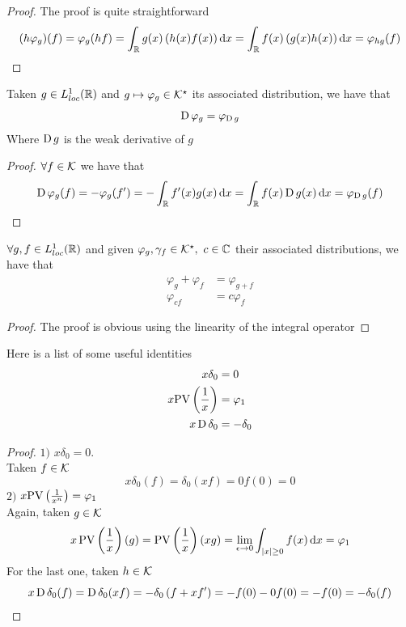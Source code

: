 \documentclass[../complete.tex]{subfiles}
\begin{document}
\begin{proof}
	The proof is quite straightforward
	\begin{equation*}
		(h\varphi_g)(f)=\varphi_g(hf)=\int_{\R}^{}g(x)\left( h(x)f(x) \right)\diff x=\int_{\R}^{}f(x)\left( g(x)h(x) \right)\diff x=\varphi_{hg}(f)
	\end{equation*}
\end{proof}
\begin{thm}
	Taken $g\in L^1_{loc}(\R)$ and $g\mapsto\varphi_g\in\K^\star$ its associated distribution, we have that
	\begin{equation*}
		\D\varphi_g=\varphi_{\D g}
	\end{equation*}
	Where $\D g$ is the weak derivative of $g$
\end{thm}
\begin{proof}
	$\forall f\in\K$ we have that
	\begin{equation*}
		\D\varphi_g(f)=-\varphi_g(f')=-\int_{\R}^{}f'(x)g(x)\diff x=\int_{\R}^{}f(x)\D g(x)\diff x=\varphi_{\D g}(f)
	\end{equation*}
\end{proof}
\begin{thm}
	$\forall g,f\in L^1_{loc}(\R)$ and given $\varphi_g,\gamma_f\in\K^\star,\ c\in\Cf$ their associated distributions, we have that
	\begin{equation*}
		\begin{aligned}
			\varphi_g+\varphi_f&=\varphi_{g+f}\\
			\varphi_{cf}&=c\varphi_f
		\end{aligned}
	\end{equation*}
\end{thm}
\begin{proof}
	The proof is obvious using the linearity of the integral operator
\end{proof}
\begin{thm}
	Here is a list of some useful identities
	\begin{equation}
		\begin{aligned}
			x\delta_0&=0\\
			x\cpvdist[]&=\varphi_1\\
			x\D\delta_0&=-\delta_0
		\end{aligned}
		\label{eq:distitent}
	\end{equation}
\end{thm}
\begin{proof}
	$1)$ $x\delta_0=0$.\\
	Taken $f\in\K$
	\begin{equation*}
		x\delta_0(f)=\delta_0(xf)=0f(0)=0
	\end{equation*}
	$2)$ $x\cpvdist=\varphi_1$\\
	Again, taken $g\in\K$
	\begin{equation*}
		x\cpv\left( \frac{1}{x} \right)(g)=\cpv\left( \frac{1}{x} \right)(xg)=\lim_{\epsilon\to0}\int_{\abs{x}\ge0}^{}f(x)\diff x=\varphi_1
	\end{equation*}
	For the last one, taken $h\in\K$
	\begin{equation*}
		x\D\delta_0(f)=\D\delta_0(xf)=-\delta_0\left( f+xf' \right)=-f(0)-0f(0)=-f(0)=-\delta_0(f)
	\end{equation*}
\end{proof}
\end{document}
